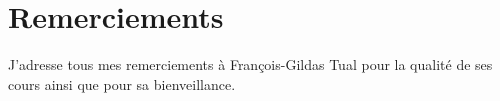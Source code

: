
\section*{Remerciements}

J'adresse tous mes remerciements à François-Gildas Tual pour la qualité de ses
cours ainsi que pour sa bienveillance.

